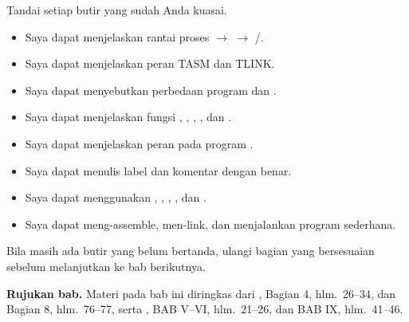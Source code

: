 \begin{checklistbox}
\vspace{1.1em}
Tandai setiap butir yang sudah Anda kuasai.

\begin{itemize}
    \item[\checkbox] Saya dapat menjelaskan rantai proses
           $\rightarrow$  $\rightarrow$
          /.
    \item[\checkbox] Saya dapat menjelaskan peran TASM dan TLINK.
    \item[\checkbox] Saya dapat menyebutkan perbedaan program
           dan .
    \item[\checkbox] Saya dapat menjelaskan fungsi ,
          , , , dan .
    \item[\checkbox] Saya dapat menjelaskan peran 
          pada program .
    \item[\checkbox] Saya dapat menulis label dan komentar dengan
          benar.
    \item[\checkbox] Saya dapat menggunakan , ,
          , , dan .
    \item[\checkbox] Saya dapat meng-assemble, men-link, dan
          menjalankan program sederhana.
\end{itemize}

\vspace{0.4em}
Bila masih ada butir yang belum bertanda, ulangi bagian yang
bersesuaian sebelum melanjutkan ke bab berikutnya.
\end{checklistbox}

\begin{infobox}
\vspace{1.1em}
\textbf{Rujukan bab.} Materi pada bab ini diringkas dari
\cite{gunawan2019}, Bagian 4, hlm.~26--34, dan Bagian 8,
hlm.~76--77, serta \cite{sto2001}, BAB V--VI, hlm.~21--26, dan
BAB IX, hlm.~41--46.
\end{infobox}
